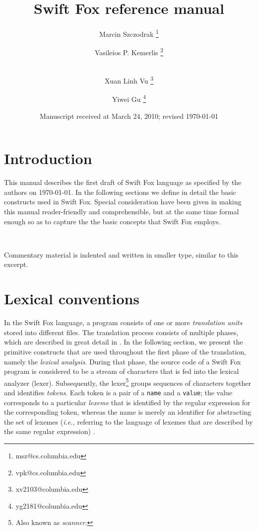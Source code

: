 \documentclass[11pt]{article}
\begin{document}
\title{Swift Fox reference manual}
\author{Marcin Szczodrak \footnote{msz@cs.columbia.edu}}
\author{Vasileios P. Kemerlis \footnote{vpk@cs.columbia.edu}}
\author{\\ Xuan Linh Vu \footnote{xv2103@columbia.edu}}
\author{Yiwei Gu \footnote{yg2181@columbia.edu}}
\date{Manuscript received at March 24, 2010; revised \today}
\maketitle


\section{Introduction}
\label{sec:introduction}

This manual describes the first draft of Swift Fox language as specified by
the authors on \today. In the following sections we define in detail the
basic constructs used in Swift Fox. Special consideration have been given in
making this manual reader-friendly and comprehensible, but at the same time
formal enough so as to capture the the basic concepts that Swift Fox 
employs.

\

\hangindent=4cm
\small
\noindent
Commentary material is indented and written in smaller type, similar to
this excerpt.
\normalsize

\section{Lexical conventions}

In the Swift Fox language, a program consists of one or more
\textit{translation units} stored into different files. The translation
process consists of multiple phases, which are described in great detail in 
\cite{marcin:tutorial}. In the following section, we present the primitive 
constructs that are used throughout the first phase of the translation,
namely the \textit{lexical analysis}. During that phase, the source code of
a Swift Fox program is considered to be a stream of characters that is fed
into the lexical analyzer (lexer). Subsequently, the lexer\footnote{Also
known as \textit{scanner}.} groups sequences of characters together and
identifies \textit{tokens}. Each token is a pair of a \texttt{name} and a
\texttt{value}; the value corresponds to a particular \textit{lexeme} that 
is identified by the regular expression for the corresponding token,
whereas the name is merely an identifier for abstracting the set of lexemes
(\textit{i.e.,} referring to the language of lexemes that are described by 
the same regular expression) \cite{aho:2007}.
\end{document}
